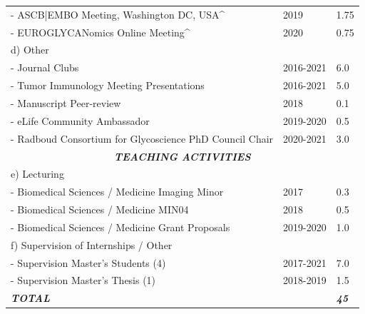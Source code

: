 \begin{table}[h]
{\begin{tabular}{llllll}
\multicolumn{4}{l}{- ASCB|EMBO Meeting, Washington DC, USA\textasciicircum{}}                       & 2019      & 1.75                 \\
\multicolumn{4}{l}{- EUROGLYCANomics Online Meeting\textasciicircum{}}                              & 2020      & 0.75                 \\ \hline
\multicolumn{4}{l}{d) Other}                                                                        &           &                      \\
\multicolumn{4}{l}{- Journal Clubs}                                                                 & 2016-2021 & 6.0                  \\
\multicolumn{4}{l}{- Tumor Immunology Meeting Presentations}                                        & 2016-2021 & 5.0                  \\
\multicolumn{4}{l}{- Manuscript Peer-review}                                                        & 2018      & 0.1                  \\
\multicolumn{4}{l}{- eLife Community Ambassador}                                                    & 2019-2020 & 0.5                  \\
\multicolumn{4}{l}{- Radboud Consortium for Glycoscience PhD Council Chair}                         & 2020-2021 & 3.0                  \\ \hline
\multicolumn{6}{c}{\textit{\textbf{TEACHING ACTIVITIES}}}                                                                                                \\ \hline
\multicolumn{4}{l}{e) Lecturing}                                                                    &           &                      \\
\multicolumn{4}{l}{- Biomedical Sciences / Medicine Imaging Minor}                                  & 2017      & 0.3                  \\
\multicolumn{4}{l}{- Biomedical Sciences / Medicine MIN04}                                          & 2018      & 0.5                  \\
\multicolumn{4}{l}{- Biomedical Sciences / Medicine Grant Proposals}                                & 2019-2020 & 1.0                  \\ \hline
\multicolumn{4}{l}{f) Supervision of Internships / Other}                                           &           &                      \\
\multicolumn{4}{l}{- Supervision Master's Students (4)}                                             & 2017-2021 & 7.0                  \\
\multicolumn{4}{l}{- Supervision Master's Thesis (1)}                                               & 2018-2019 & 1.5                  \\
\multicolumn{5}{l}{\textit{\textbf{TOTAL}}}                                                                     & \textit{\textbf{45}}
\end{tabular}%
}
\end{table}

\cleartoleftpage